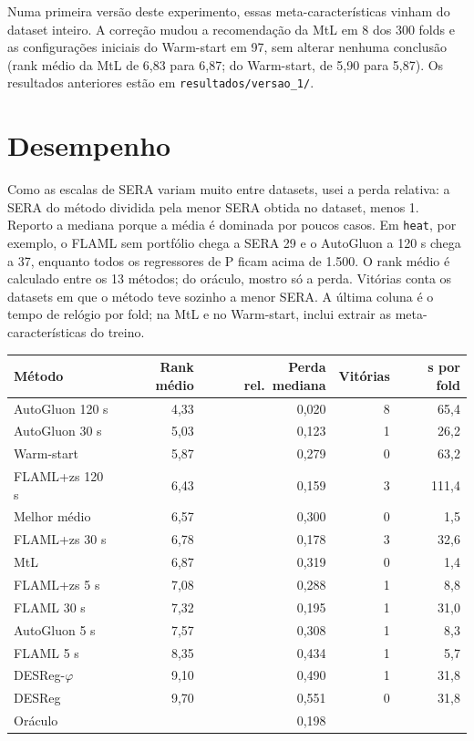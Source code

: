 \documentclass[10pt,a4paper]{article}
\begin{document}
Numa primeira versão deste experimento, essas meta-características vinham do dataset inteiro. A correção mudou a recomendação da MtL em 8 dos 300 folds e as configurações iniciais do Warm-start em 97, sem alterar nenhuma conclusão (rank médio da MtL de 6,83 para 6,87; do Warm-start, de 5,90 para 5,87). Os resultados anteriores estão em \texttt{resultados/versao\_1/}.

\section{Desempenho}

Como as escalas de SERA variam muito entre datasets, usei a perda relativa: a SERA do método dividida pela menor SERA obtida no dataset, menos 1. Reporto a mediana porque a média é dominada por poucos casos. Em \texttt{heat}, por exemplo, o FLAML sem portfólio chega a SERA 29 e o AutoGluon a 120 s chega a 37, enquanto todos os regressores de P ficam acima de 1.500. O rank médio é calculado entre os 13 métodos; do oráculo, mostro só a perda. Vitórias conta os datasets em que o método teve sozinho a menor SERA. A última coluna é o tempo de relógio por fold; na MtL e no Warm-start, inclui extrair as meta-características do treino.

\begin{center}\small
\begin{tabular}{lrrrr}
\toprule
Método & Rank médio & Perda rel.\ mediana & Vitórias & s por fold \\
\midrule
AutoGluon 120 s & 4,33 & 0,020 & 8 & 65,4 \\
AutoGluon 30 s & 5,03 & 0,123 & 1 & 26,2 \\
Warm-start & 5,87 & 0,279 & 0 & 63,2 \\
FLAML+zs 120 s & 6,43 & 0,159 & 3 & 111,4 \\
Melhor médio & 6,57 & 0,300 & 0 & 1,5 \\
FLAML+zs 30 s & 6,78 & 0,178 & 3 & 32,6 \\
MtL & 6,87 & 0,319 & 0 & 1,4 \\
FLAML+zs 5 s & 7,08 & 0,288 & 1 & 8,8 \\
FLAML 30 s & 7,32 & 0,195 & 1 & 31,0 \\
AutoGluon 5 s & 7,57 & 0,308 & 1 & 8,3 \\
FLAML 5 s & 8,35 & 0,434 & 1 & 5,7 \\
DESReg-$\varphi$ & 9,10 & 0,490 & 1 & 31,8 \\
DESReg & 9,70 & 0,551 & 0 & 31,8 \\
Oráculo &  & 0,198 &  &  \\
\bottomrule
\end{tabular}
\end{center}
\end{document}
